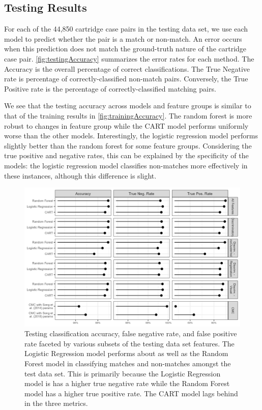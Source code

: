 \documentclass[
]{jdssv}
\begin{document}
\hypertarget{testing-results}{%
\subsection{Testing Results}\label{testing-results}}

For each of the 44,850 cartridge case pairs in the testing data set, we
use each model to predict whether the pair is a match or non-match. An
error occurs when this prediction does not match the ground-truth nature
of the cartridge case pair. \autoref{fig:testingAccuracy} summarizes the
error rates for each method. The Accuracy is the overall percentage of
correct classifications. The True Negative rate is percentage of
correctly-classified non-match pairs. Conversely, the True Positive rate
is the percentage of correctly-classified matching pairs.

We see that the testing accuracy across models and feature groups is
similar to that of the training results in
\autoref{fig:trainingAccuracy}. The random forest is more robust to
changes in feature group while the CART model performs uniformly worse
than the other models. Interestingly, the logistic regression model
performs slightly better than the random forest for some feature groups.
Considering the true positive and negative rates, this can be explained
by the specificity of the models: the logistic regression model
classifies non-matches more effectively in these instances, although
this difference is slight.

\begin{CodeChunk}
\begin{figure}

{\centering \includegraphics[width=\textwidth]{figures/testAccuracy} 

}

\caption{\label{fig:testingAccuracy} Testing classification accuracy, false negative rate, and false positive rate faceted by various subsets of the testing data set features. The Logistic Regression model performs about as well as the Random Forest model in classifying matches and non-matches amongst the test data set. This is primarily because the Logistic Regression model is has a higher true negative rate while the Random Forest model has a higher true positive rate. The CART model lags behind in the three metrics.}\label{fig:unnamed-chunk-30}
\end{figure}
\end{CodeChunk}
\end{document}
